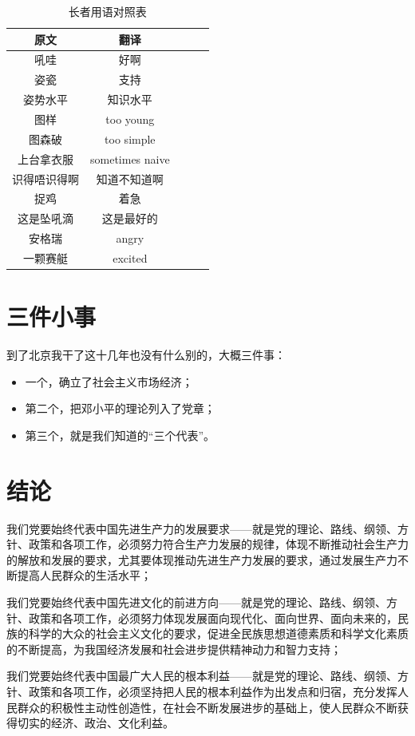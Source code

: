 \begin{table}[htbp]
	\caption{长者用语对照表}\label{table}
	\vspace{0.5em}\centering\wuhao
	\begin{tabular}{ccccc}
		\toprule[1.5pt]
		原文 & 翻译 \\
		\midrule[1pt]
		吼哇 & 好啊 \\
		姿瓷 & 支持 \\
		姿势水平 & 知识水平 \\
		图样 & too young \\
		图森破 & too simple \\
		上台拿衣服 & sometimes naive \\
		识得唔识得啊 & 知道不知道啊 \\
		捉鸡 & 着急 \\
		这是坠吼滴 & 这是最好的 \\
		安格瑞 & angry \\
		一颗赛艇 & excited \\
		\bottomrule[1.5pt]
	\end{tabular}
	\vspace{\baselineskip}
\end{table}


\section{三件小事}
到了北京我干了这十几年也没有什么别的，大概三件事：

\begin{itemize}
	\item 一个，确立了社会主义市场经济；
	\item 第二个，把邓小平的理论列入了党章；
	\item 第三个，就是我们知道的“三个代表”。
\end{itemize}

\section{结论}
我们党要始终代表中国先进生产力的发展要求——就是党的理论、路线、纲领、方针、政策和各项工作，必须努力符合生产力发展的规律，体现不断推动社会生产力的解放和发展的要求，尤其要体现推动先进生产力发展的要求，通过发展生产力不断提高人民群众的生活水平；

我们党要始终代表中国先进文化的前进方向——就是党的理论、路线、纲领、方针、政策和各项工作，必须努力体现发展面向现代化、面向世界、面向未来的，民族的科学的大众的社会主义文化的要求，促进全民族思想道德素质和科学文化素质的不断提高，为我国经济发展和社会进步提供精神动力和智力支持；

我们党要始终代表中国最广大人民的根本利益——就是党的理论、路线、纲领、方针、政策和各项工作，必须坚持把人民的根本利益作为出发点和归宿，充分发挥人民群众的积极性主动性创造性，在社会不断发展进步的基础上，使人民群众不断获得切实的经济、政治、文化利益。
